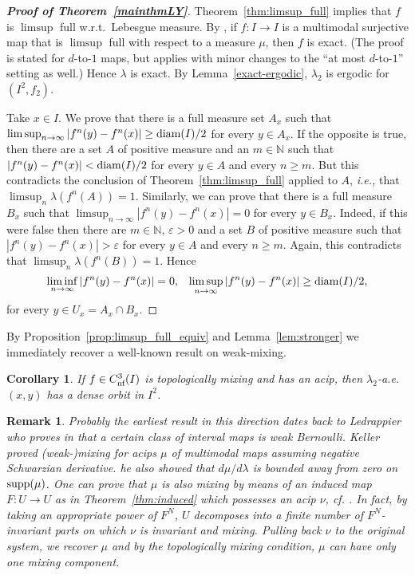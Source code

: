 \documentclass[12pt, psamsfonts, reqno]{amsart}
\newtheorem{corollary}[theorem]{Corollary}
\newtheorem{remark}[theorem]{Remark}
\begin{document}
\begin{proof}[\textbf{Proof of Theorem~\ref{mainthmLY}}]
Theorem~\ref{thm:limsup_full} implies that $f$ is $\limsup$ full
w.r.t.\ Lebesgue measure. By \cite[Theorem A]{Bar}, if  $f:I\to I$
is a multimodal surjective map that is $\limsup$ full with respect
to a measure $\mu$, then $f$ is exact. (The proof is stated for
$d$-to-$1$ maps, but applies with minor changes to the ``at most
$d$-to-$1$'' setting as well.) Hence $\lambda$ is exact.  By
Lemma~\ref{exact-ergodic}, $\lambda_2$ is  ergodic for $(I^2,
f_2)$.

Take $x\in I$. We prove that there is a full measure set $A_x$
such that $\limsup_{n\to\infty} |f^n(y)- f^n(x)|\geq {\mathop{\rm diam}\nolimits}(I)/2$
for every $y\in A_x$. If the opposite is true, then there are a
set $A$ of positive measure and an $m \in {{\mathbb N}}$ such that $|f^n(y)-
f^n(x)|< {\mathop{\rm diam}\nolimits}(I)/2$ for every $y\in A$ and every $n\geq m$. But
this contradicts the conclusion of Theorem~\ref{thm:limsup_full}
applied to $A$, {{\em i.e., }} that $\limsup_n \lambda(f^n(A))=1$. Similarly,
we can prove that there is a full measure $B_x$ such that
$\limsup_{n\to\infty} |f^n(y)- f^n(x)|=0$ for every $y\in B_x$.
Indeed, if this were false then there are $m \in {{\mathbb N}}$, ${\varepsilon} > 0$
and a set $B$ of positive measure such that $|f^n(y)- f^n(x)| >
{\varepsilon}$ for every $y\in A$ and every $n\geq m$. Again, this
contradicts that $\limsup_n \lambda(f^n(B))=1$. Hence
 $$
  \liminf_{n\to\infty} |f^n(y)- f^n(x)|=0, \;\;\;\limsup_{n\to\infty}
  |f^n(y)- f^n(x)|\geq {\mathop{\rm diam}\nolimits}(I)/2,
  $$
for every $y\in U_x=A_x\cap B_x$.
\end{proof}

By Proposition~\ref{prop:limsup_full_equiv} and
Lemma~\ref{lem:stronger} we immediately recover a well-known
result on weak-mixing.

\begin{corollary}\label{cor:density}
 If $f\in {C^3_{\text{\rm nf}}}(I)$ is topologically mixing and has an acip, then
 $\lambda_2$-a.e. $(x,y)$ has a dense orbit in $I^2$.
\end{corollary}

\begin{remark}
Probably the earliest result in this direction dates back to
Ledrappier  who proves in \cite[Theorem 1]{Ledrap} that a certain
class of interval maps is weak Bernoulli. Keller \cite{keller}
proved (weak-)mixing for acips $\mu$ of multimodal maps assuming
negative Schwarzian derivative. he also showed that
$d\mu/d\lambda$ is bounded away from zero on ${\mathop{\rm supp}\nolimits}(\mu)$. One can
prove that $\mu$ is also mixing by means of an induced map $F:U
\to U$ as in Theorem~\ref{thm:induced} which possesses an acip
$\nu$, cf. \cite{Y}. In fact, by taking an appropriate power of
$F^N$, $U$ decomposes into a finite number of $F^N$-invariant
parts on which $\nu$ is invariant and mixing. Pulling back $\nu$
to the original system, we recover $\mu$ and by the topologically
mixing condition, $\mu$ can have only one mixing component.
\end{remark}
\end{document}
